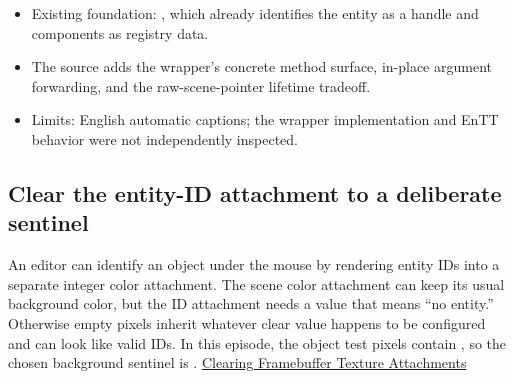 \hypertarget{06-engine-ii-ch031-source-to-volume-map-1}{}

\begin{itemize}
\tightlist
\item
  Existing foundation: , which already identifies the entity as a handle and components as registry data.
\item
  The source adds the wrapper's concrete method surface, in-place argument forwarding, and the raw-scene-pointer lifetime tradeoff.
\item
  Limits: English automatic captions; the wrapper implementation and EnTT behavior were not independently inspected.
\end{itemize}

\subsection{Clear the entity-ID attachment to a deliberate sentinel}\label{06-engine-ii-ch031-clear-the-entity-id-attachment-to-a-deliberate-sentinel}

\hypertarget{06-engine-ii-ch031-clear-the-entity-id-attachment-to-a-deliberate-sentinel}{}

An editor can identify an object under the mouse by rendering entity IDs into a separate integer color attachment. The scene color attachment can keep its usual background color, but the ID attachment needs a value that means ``no entity.'' Otherwise empty pixels inherit whatever clear value happens to be configured and can look like valid IDs. In this episode, the object test pixels contain , so the chosen background sentinel is . \href{https://www.youtube.com/watch?v=LPhBiIvDOs0}{Clearing Framebuffer Texture Attachments}

